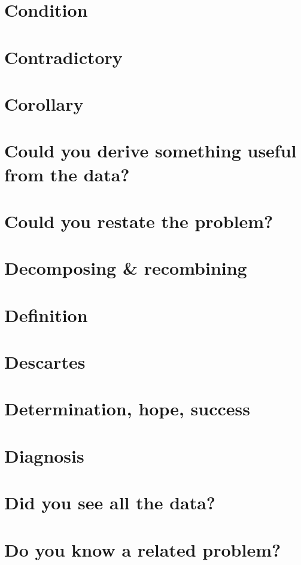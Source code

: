 \documentclass[oneside]{book}
\numberwithin{equation}{section}
\begin{document}
\section{Condition}

\section{Contradictory}

\section{Corollary}

\section{Could you derive something useful from the data?}

\section{Could you restate the problem?}

\section{Decomposing \& recombining}

\section{Definition}

\section{Descartes}

\section{Determination, hope, success}

\section{Diagnosis}

\section{Did you see all the data?}

\section{Do you know a related problem?}
\end{document}

